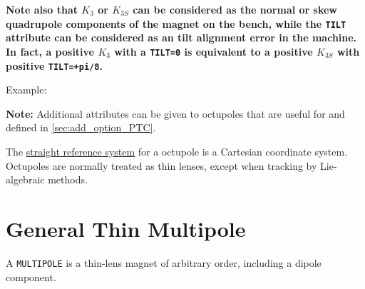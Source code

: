 \textbf{Note also that $K_3$ or $K_{3S}$ can be considered as the normal or
  skew quadrupole components of the magnet on the bench, while the {\tt TILT}
  attribute can be considered as an tilt alignment error in the
  machine. In fact, a positive $K_3$ with a {\tt TILT=0} is equivalent to a
  positive $K_{3S}$ with positive {\tt TILT=+pi/8}. } 

Example: 

{\bf Note:} Additional attributes can be given to octupoles that
are useful for \ptc and defined in \ref{sec:add_option_PTC}.

The \hyperref[subsec:local_straight]{straight reference system} for a
octupole is a Cartesian coordinate system. Octupoles are normally
treated as thin lenses, except when tracking by Lie-algebraic methods.   



\section{General Thin Multipole}
\label{sec:multipole}

A {\tt MULTIPOLE} is a thin-lens magnet of arbitrary order, including a 
dipole component.


